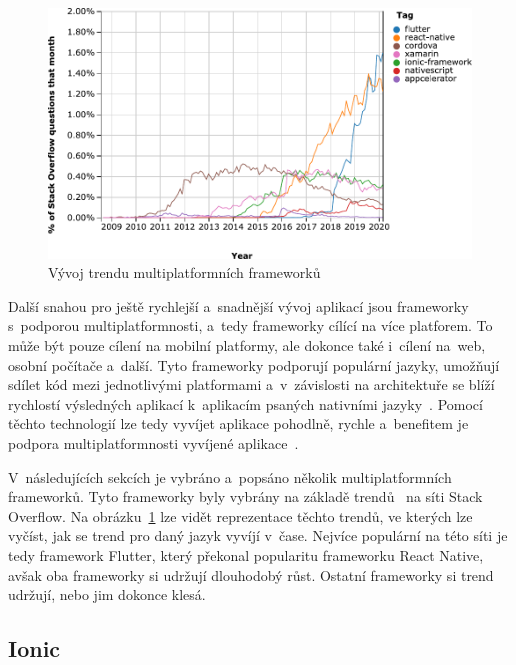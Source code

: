 \begin{figure}
    \centering
    \includegraphics[width=\linewidth]{assets/technology-research/framework/popularity.pdf}
    \caption{Vývoj trendu multiplatformních
    frameworků~\cite{framework_popularity}}
    \label{fig:framework_popularity}
\end{figure}

Další snahou pro ještě rychlejší a~snadnější vývoj aplikací jsou frameworky
s~podporou multiplatformnosti,
a~tedy frameworky cílící na více platforem.
To může být pouze cílení na mobilní platformy,
ale dokonce také i~cílení na~web, osobní počítače a~další.
Tyto frameworky podporují populární jazyky,
umožňují sdílet kód mezi jednotlivými platformami
a~v~závislosti na architektuře se blíží rychlostí výsledných aplikací
k~aplikacím psaných nativními jazyky~\cite{hackernoon_flutter}.
Pomocí těchto technologií lze tedy vyvíjet aplikace pohodlně, rychle
a~benefitem  je podpora multiplatformnosti vyvíjené
aplikace~\cite{dashmagazine_mobile_frameworks}.

V~následujících sekcích je vybráno a~popsáno několik multiplatformních
frameworků.
Tyto frameworky byly vybrány na základě trendů~\cite{framework_popularity}
na síti Stack Overflow.
Na obrázku~\ref{fig:framework_popularity} lze vidět reprezentace těchto trendů,
ve kterých lze vyčíst,
jak se trend pro daný jazyk vyvíjí v~čase.
Nejvíce populární na této síti je tedy framework Flutter,
který překonal popularitu frameworku React Native,
avšak oba frameworky si udržují dlouhodobý růst.
Ostatní frameworky si trend udržují,
nebo jim dokonce klesá.

\subsection{Ionic}

